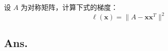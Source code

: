 \begin{example}
    设 \( A \) 为对称矩阵，计算下式的梯度：
    \[
    \ell(\mathbf{x}) = \|A - \mathbf{x}\mathbf{x}^T\|^2
    \]
    \end{example}

    \subsection*{Ans.}
    